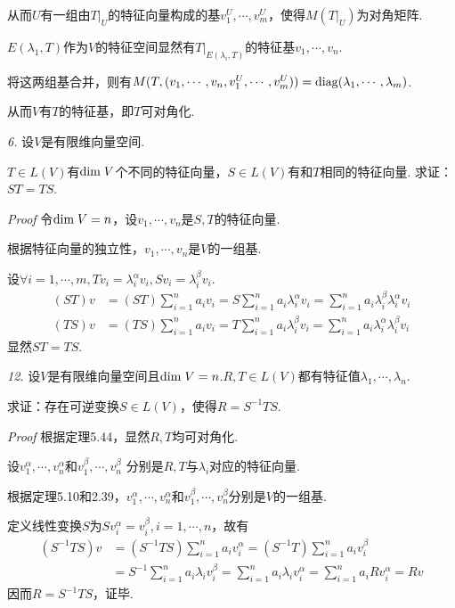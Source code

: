 从而\(U\)有一组由\(T|_U\)的特征向量构成的基\(v_1^U,\cdots,v_m^U\)，使得\(M(T|_U)\)为对角矩阵.

\(E(\lambda_1,T)\)作为\(V\)的特征空间显然有\(T|_{E(\lambda_i,T)}\)的特征基\(v_1,\cdots,v_n\).

将这两组基合并，则有\(M(T,(v_1,\cdots,v_n,v_1^U,\cdots,v_m^U))=\mathrm{diag}(\lambda_1,\cdots,\lambda_m)\).

从而\(V\)有\(T\)的特征基，即\(T\)可对角化.

\newpage

\textit{6.}
设\(V\)是有限维向量空间.

\(T \in L(V)\)有\(\mathrm{dim \;} V\)个不同的特征向量，\(S \in L(V)\)有和\(T\)相同的特征向量.
求证：\(ST=TS\).

\textit{Proof}
令\(\mathrm{dim \;} V=n\)，设\(v_1,\cdots,v_n\)是\(S,T\)的特征向量.

根据特征向量的独立性，\(v_1,\cdots,v_n\)是\(V\)的一组基.

设\(\forall i=1,\cdots,m,Tv_i=\lambda_i^\alpha v_i,Sv_i=\lambda_i^\beta v_i\).
    \begin{align*}
        (ST)v &=(ST)\sum_{i=1}^n a_iv_i=S\sum_{i=1}^n a_i \lambda_i^\alpha v_i
                =\sum_{i=1}^n a_i \lambda_i^\beta \lambda_i^\alpha v_i \\
        (TS)v &=(TS)\sum_{i=1}^n a_iv_i=T\sum_{i=1}^n a_i \lambda_i^\beta v_i
                =\sum_{i=1}^n a_i \lambda_i^\alpha \lambda_i^\beta v_i
    \end{align*}
显然\(ST=TS\).

\hspace*{\fill}

\textit{12.}
设\(V\)是有限维向量空间且\(\mathrm{dim \;} V=n\).\(R,T \in L(V)\)都有特征值\(\lambda_1,\cdots,\lambda_n\).

求证：存在可逆变换\(S \in L(V)\)，使得\(R=S^{-1}TS\).

\textit{Proof}
根据定理5.44，显然\(R,T\)均可对角化.

设\(v_1^\alpha,\cdots,v_n^\alpha\)和\(v_1^\beta,\cdots,v_n^\beta\)
分别是\(R,T\)与\(\lambda_i\)对应的特征向量.

根据定理5.10和2.39，\(v_1^\alpha,\cdots,v_n^\alpha\)和\(v_1^\beta,\cdots,v_n^\beta\)分别是\(V\)的一组基.

定义线性变换\(S\)为\(Sv_i^\alpha=v_i^\beta,i=1,\cdots,n\)，故有
    \begin{align*}
        (S^{-1}TS)v &=(S^{-1}TS)\sum_{i=1}^n a_iv_i^\alpha=(S^{-1}T)\sum_{i=1}^n a_iv_i^\beta \\
                    &=S^{-1}\sum_{i=1}^n a_i\lambda_i v_i^\beta=\sum_{i=1}^n a_i\lambda_i v_i^\alpha
                     =\sum_{i=1}^n a_iRv_i^\alpha=Rv
    \end{align*}
因而\(R=S^{-1}TS\)，证毕.

